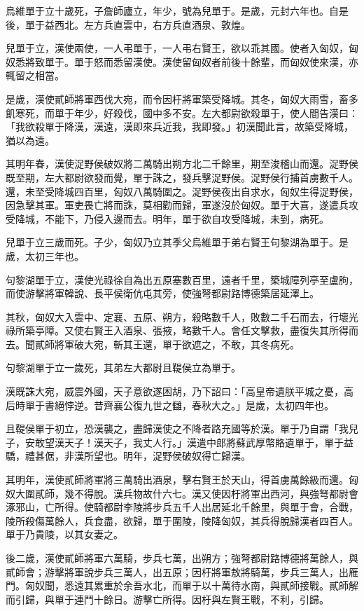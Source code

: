 \begin{pinyinscope}
烏維單于立十歲死，子詹師廬立，年少，號為兒單于。是歲，元封六年也。自是後，單于益西北。左方兵直雲中，右方兵直酒泉、敦煌。

兒單于立，漢使兩使，一人弔單于，一人弔右賢王，欲以乖其國。使者入匈奴，匈奴悉將致單于。單于怒而悉留漢使。漢使留匈奴者前後十餘輩，而匈奴使來漢，亦輒留之相當。

是歲，漢使貳師將軍西伐大宛，而令因杅將軍築受降城。其冬，匈奴大雨雪，畜多飢寒死，而單于年少，好殺伐，國中多不安。左大都尉欲殺單于，使人間告漢曰：「我欲殺單于降漢，漢遠，漢即來兵近我，我即發。」初漢聞此言，故築受降城，猶以為遠。

其明年春，漢使浞野侯破奴將二萬騎出朔方北二千餘里，期至浚稽山而還。浞野侯既至期，左大都尉欲發而覺，單于誅之，發兵擊浞野侯。浞野侯行捕首虜數千人。還，未至受降城四百里，匈奴八萬騎圍之。浞野侯夜出自求水，匈奴生得浞野侯，因急擊其軍。軍吏畏亡將而誅，莫相勸而歸，軍遂沒於匈奴。單于大喜，遂遣兵攻受降城，不能下，乃侵入邊而去。明年，單于欲自攻受降城，未到，病死。

兒單于立三歲而死。子少，匈奴乃立其季父烏維單于弟右賢王句黎湖為單于。是歲，太初三年也。

句黎湖單于立，漢使光祿徐自為出五原塞數百里，遠者千里，築城障列亭至盧朐，而使游擊將軍韓說、長平侯衛伉屯其旁，使強弩都尉路博德築居延澤上。

其秋，匈奴大入雲中、定襄、五原、朔方，殺略數千人，敗數二千石而去，行壞光祿所築亭障。又使右賢王入酒泉、張掖，略數千人。會任文擊救，盡復失其所得而去。聞貳師將軍破大宛，斬其王還，單于欲遮之，不敢，其冬病死。

句黎湖單于立一歲死，其弟左大都尉且鞮侯立為單于。

漢既誅大宛，威震外國，天子意欲遂困胡，乃下詔曰：「高皇帝遺朕平城之憂，高后時單于書絕悖逆。昔齊襄公復九世之讎，春秋大之。」是歲，太初四年也。

且鞮侯單于初立，恐漢襲之，盡歸漢使之不降者路充國等於漢。單于乃自謂「我兒子，安敢望漢天子！漢天子，我丈人行。」漢遣中郎將蘇武厚幣賂遺單于，單于益驕，禮甚倨，非漢所望也。明年，浞野侯破奴得亡歸漢。

其明年，漢使貳師將軍將三萬騎出酒泉，擊右賢王於天山，得首虜萬餘級而還。匈奴大圍貳師，幾不得脫。漢兵物故什六七。漢又使因杅將軍出西河，與強弩都尉會涿邪山，亡所得。使騎都尉李陵將步兵五千人出居延北千餘里，與單于會，合戰，陵所殺傷萬餘人，兵食盡，欲歸，單于圍陵，陵降匈奴，其兵得脫歸漢者四百人。單于乃貴陵，以其女妻之。

後二歲，漢使貳師將軍六萬騎，步兵七萬，出朔方；強弩都尉路博德將萬餘人，與貳師會；游擊將軍說步兵三萬人，出五原；因杅將軍敖將騎萬，步兵三萬人，出雁門。匈奴聞，悉遠其累重於余吾水北，而單于以十萬待水南，與貳師接戰。貳師解而引歸，與單于連鬥十餘日。游擊亡所得。因杅與左賢王戰，不利，引歸。


\end{pinyinscope}
